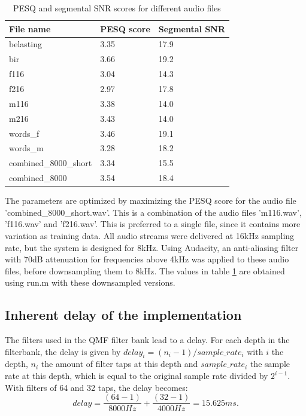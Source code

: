 \documentclass[a4paper]{article}
\begin{document}
\begin{table}[bth]
\begin{center}
\begin{tabular}{ l|ll }
  File name & PESQ score & Segmental SNR \\
  \hline
  belasting & 3.35 & 17.9\\
  bir & 3.66 & 19.2\\
  f116 & 3.04 & 14.3 \\
  f216 & 2.97 & 17.8\\
  m116 & 3.38 & 14.0\\
  m216 & 3.43 & 14.0\\
  words\_f & 3.46 & 19.1\\
  words\_m & 3.28 & 18.2\\
  combined\_8000\_short & 3.34 & 15.5 \\
  combined\_8000 & 3.54 & 18.4\\
  \hline
\end{tabular}
  \caption{PESQ and segmental SNR scores for different audio files}
\label{tab:pesqscores}
\end{center}
\end{table}

The parameters are optimized by maximizing the PESQ score for the audio file 'combined\_8000\_short.wav'. This is a combination of the audio files 'm116.wav', 'f116.wav' and 'f216.wav'. This is preferred to a single file, since it contains more variation as training data. All audio streams were delivered at 16kHz sampling rate, but the system is designed for 8kHz. Using Audacity, an anti-aliasing filter with 70dB attenuation for frequencies above 4kHz was applied to these audio files, before downsampling them to 8kHz. The values in table \ref{tab:pesqscores} are obtained using run.m with these downsampled versions.

\subsection{Inherent delay of the implementation}
The filters used in the QMF filter bank lead to a delay. For each depth in the filterbank, the delay is given by $delay_i = (n_i-1) / sample\_rate_i$ with $i$ the depth, $n_i$ the amount of filter taps at this depth and $sample\_rate_i$ the sample rate at this depth, which is equal to the original sample rate divided by $2^{i-1}$. With filters of 64 and 32 taps, the delay becomes:
\begin{equation*}
delay = \frac{(64-1)}{8000 Hz} + \frac{(32-1)}{4000 Hz} = 15.625 ms.
\end{equation*}
\end{document}
